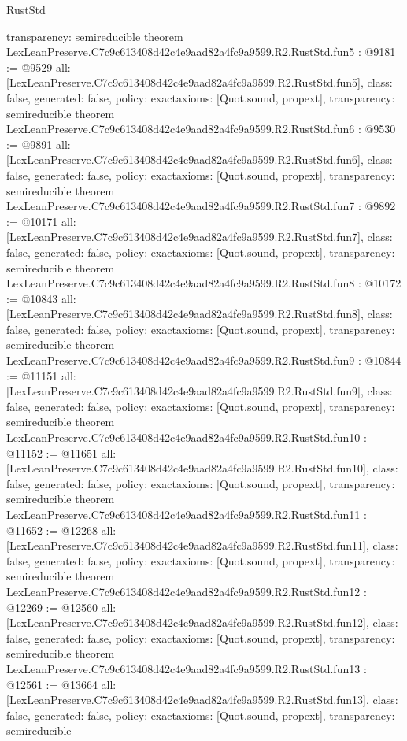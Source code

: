 \begin{lexlean}{RustStd}
\begin{coremodule}
{  transparency: semireducible
}
theorem LexLeanPreserve.C7c9c613408d42c4e9aad82a4fc9a9599.R2.RustStd.fun5 : @9181 := @9529 {
  all: [LexLeanPreserve.C7c9c613408d42c4e9aad82a4fc9a9599.R2.RustStd.fun5],
  class: false,
  generated: false,
  policy: exact{axioms: [Quot.sound, propext]},
  transparency: semireducible
}
theorem LexLeanPreserve.C7c9c613408d42c4e9aad82a4fc9a9599.R2.RustStd.fun6 : @9530 := @9891 {
  all: [LexLeanPreserve.C7c9c613408d42c4e9aad82a4fc9a9599.R2.RustStd.fun6],
  class: false,
  generated: false,
  policy: exact{axioms: [Quot.sound, propext]},
  transparency: semireducible
}
theorem LexLeanPreserve.C7c9c613408d42c4e9aad82a4fc9a9599.R2.RustStd.fun7 : @9892 := @10171 {
  all: [LexLeanPreserve.C7c9c613408d42c4e9aad82a4fc9a9599.R2.RustStd.fun7],
  class: false,
  generated: false,
  policy: exact{axioms: [Quot.sound, propext]},
  transparency: semireducible
}
theorem LexLeanPreserve.C7c9c613408d42c4e9aad82a4fc9a9599.R2.RustStd.fun8 : @10172 := @10843 {
  all: [LexLeanPreserve.C7c9c613408d42c4e9aad82a4fc9a9599.R2.RustStd.fun8],
  class: false,
  generated: false,
  policy: exact{axioms: [Quot.sound, propext]},
  transparency: semireducible
}
theorem LexLeanPreserve.C7c9c613408d42c4e9aad82a4fc9a9599.R2.RustStd.fun9 : @10844 := @11151 {
  all: [LexLeanPreserve.C7c9c613408d42c4e9aad82a4fc9a9599.R2.RustStd.fun9],
  class: false,
  generated: false,
  policy: exact{axioms: [Quot.sound, propext]},
  transparency: semireducible
}
theorem LexLeanPreserve.C7c9c613408d42c4e9aad82a4fc9a9599.R2.RustStd.fun10 : @11152 := @11651 {
  all: [LexLeanPreserve.C7c9c613408d42c4e9aad82a4fc9a9599.R2.RustStd.fun10],
  class: false,
  generated: false,
  policy: exact{axioms: [Quot.sound, propext]},
  transparency: semireducible
}
theorem LexLeanPreserve.C7c9c613408d42c4e9aad82a4fc9a9599.R2.RustStd.fun11 : @11652 := @12268 {
  all: [LexLeanPreserve.C7c9c613408d42c4e9aad82a4fc9a9599.R2.RustStd.fun11],
  class: false,
  generated: false,
  policy: exact{axioms: [Quot.sound, propext]},
  transparency: semireducible
}
theorem LexLeanPreserve.C7c9c613408d42c4e9aad82a4fc9a9599.R2.RustStd.fun12 : @12269 := @12560 {
  all: [LexLeanPreserve.C7c9c613408d42c4e9aad82a4fc9a9599.R2.RustStd.fun12],
  class: false,
  generated: false,
  policy: exact{axioms: [Quot.sound, propext]},
  transparency: semireducible
}
theorem LexLeanPreserve.C7c9c613408d42c4e9aad82a4fc9a9599.R2.RustStd.fun13 : @12561 := @13664 {
  all: [LexLeanPreserve.C7c9c613408d42c4e9aad82a4fc9a9599.R2.RustStd.fun13],
  class: false,
  generated: false,
  policy: exact{axioms: [Quot.sound, propext]},
  transparency: semireducible
}
\end{coremodule}
\end{lexlean}
